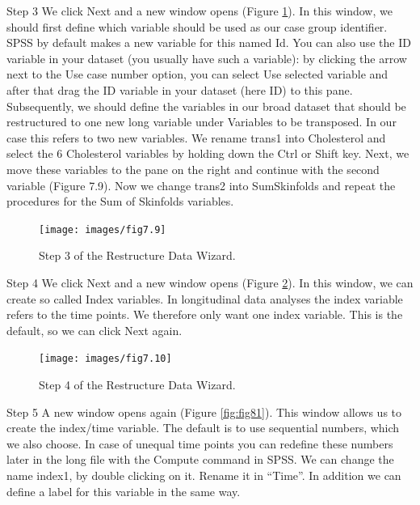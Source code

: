 \documentclass[
]{book}
\begin{document}
Step 3
We click Next and a new window opens (Figure \ref{fig:fig79}). In this window, we should first define which variable should be used as our case group identifier. SPSS by default makes a new variable for this named Id. You can also use the ID variable in your dataset (you usually have such a variable): by clicking the arrow next to the Use case number option, you can select Use selected variable and after that drag the ID variable in your dataset (here ID) to this pane. Subsequently, we should define the variables in our broad dataset that should be restructured to one new long variable under Variables to be transposed. In our case this refers to two new variables. We rename trans1 into Cholesterol and select the 6 Cholesterol variables by holding down the Ctrl or Shift key. Next, we move these variables to the pane on the right and continue with the second variable (Figure 7.9). Now we change trans2 into SumSkinfolds and repeat the procedures for the Sum of Skinfolds variables.

\begin{figure}

{\centering \texttt{[image: images/fig7.9]} 

}

\caption{Step 3 of the Restructure Data Wizard.}\label{fig:fig79}
\end{figure}

Step 4
We click Next and a new window opens (Figure \ref{fig:fig80}). In this window, we can create so called Index variables. In longitudinal data analyses the index variable refers to the time points. We therefore only want one index variable. This is the default, so we can click Next again.

\begin{figure}

{\centering \texttt{[image: images/fig7.10]} 

}

\caption{Step 4 of the Restructure Data Wizard.}\label{fig:fig80}
\end{figure}

Step 5
A new window opens again (Figure \ref{fig:fig81}). This window allows us to create the index/time variable. The default is to use sequential numbers, which we also choose. In case of unequal time points you can redefine these numbers later in the long file with the Compute command in SPSS. We can change the name index1, by double clicking on it. Rename it in ``Time''. In addition we can define a label for this variable in the same way.
\end{document}
